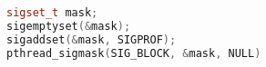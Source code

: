 \documentclass[..thesis.tex]{subfiles}
\begin{document}
\begin{lstlisting}[language=C++,style=def,label={lst:sigmask}, caption={Blocking the \texttt{SIGPROF} signal for a thread}]
sigset_t mask;
sigemptyset(&mask);
sigaddset(&mask, SIGPROF);
pthread_sigmask(SIG_BLOCK, &mask, NULL)
\end{lstlisting}

\end{document}
